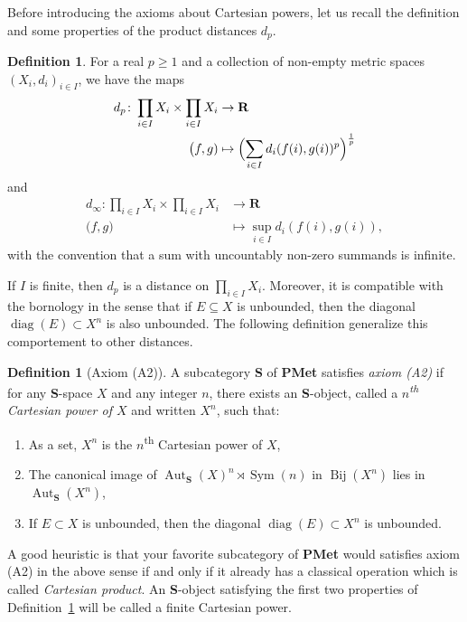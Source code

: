 \documentclass[a4paper]{article}
\newcounter{mycomment}
\newcommand{\mycomment}[2][]{\refstepcounter{mycomment}{\todo[color={green!33},size=\small]{\textbf{Commentaire [\uppercase{#1}\themycomment]:}~#2}}}
\newcommand{\GS}[1]{\mycomment[GS]{#1}}
\theoremstyle{definition}
\newtheorem{defn}[lem]{Definition}
\DeclareMathOperator\Sym{Sym}
\DeclareMathOperator\diag{diag}
\DeclareMathOperator\Aut{Aut}
\DeclareMathOperator\Bij{Bij}
\newcommand*{\field}[1]{\mathbf{#1}}
\newcommand*{\category}[1]{\textbf{#1}}
\newcommand*{\PMet}{\category{PMet}}
\newcommand*{\CatS}{\category{S}}
\newcommand*{\R}{\field{R}}
\begin{document}
Before introducing the axioms about Cartesian powers, let us recall the definition and some properties of the product distances $d_p$.
%
%
\begin{defn}
For a real $p\geq 1$ and a collection of non-empty metric spaces $(X_i,d_i)_{i\in I}$, we have the maps
\begin{align*}
d_p\colon \prod_{i\in I}X_i\times \prod_{i\in I}X_i&\to \R\\
\bigl(f,g)&\mapsto\Bigl(\sum_{i\in I}d_i(f(i),g(i))^p\Bigr)^{\frac1p}
\end{align*}
and
\begin{align*}
d_\infty\colon \prod_{i\in I}X_i\times \prod_{i\in I}X_i&\to \R\\
\bigl(f,g)&\mapsto\sup_{i\in I}d_i(f(i),g(i)),
\end{align*}
with the convention that a sum with uncountably non-zero summands is infinite.
\end{defn}
%
%
If $I$ is finite, then $d_p$ is a distance on $\prod_{i\in I}X_i$. Moreover, it is compatible with the bornology in the sense that if $E\subseteq X$ is unbounded, then the diagonal $\diag(E)\subset X^n$ is also unbounded.
The following definition generalize this comportement to other distances.
%
%
\begin{defn}[Axiom (A2)]\label{Def:Cartesian}
A subcategory \CatS{} of \PMet{} satisfies \emph{axiom (A2)} if for any \CatS-space $X$ and any integer $n$, there exists an \CatS-object, called a \emph{$n$\textsuperscript{th} Cartesian power of $X$} and written $X^n$, such that:
\begin{enumerate}
\item
As a set, $X^n$ is the $n$\textsuperscript{th} Cartesian power of $X$,
\item\label{Item:Product}
The canonical image of $\Aut_{\CatS}(X)^n\rtimes \Sym(n)$ in $\Bij(X^n)$ lies in $\Aut_{\CatS}(X^n)$,
\item\label{Condidef:2}
If $E\subset X$ is unbounded, then the diagonal $\diag(E)\subset X^n$ is unbounded.
\end{enumerate}
\end{defn}
%
%
A good heuristic is that your favorite subcategory of \PMet{} would satisfies axiom (A2) in the above sense if and only if it already has a classical operation which is called \emph{Cartesian product}.
An \CatS-object satisfying the first two properties of Definition~\ref{Def:Cartesian} will be called a finite Cartesian power.
\end{document}
